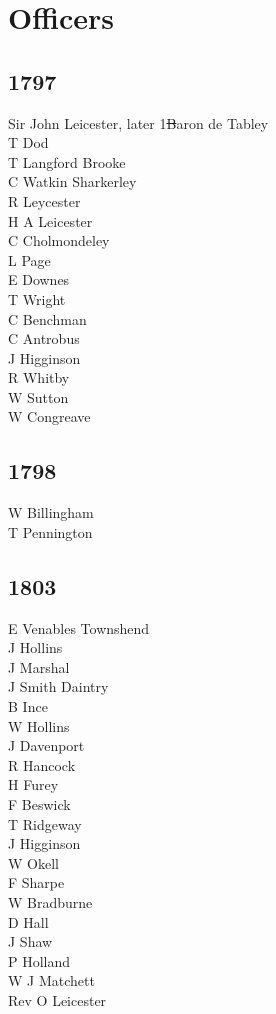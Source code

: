 \chapter*{Officers}

\begin{multicols}{2}
  \noindent
  \section*{1797}
  Sir John Leicester, later 1\st Baron de Tabley \\
  T Dod \\
  T Langford Brooke \\
  C Watkin Sharkerley \\
  R Leycester \\
  H A Leicester \\
  C Cholmondeley \\
  L Page \\
  E Downes \\
  T Wright \\
  C Benchman \\
  C Antrobus \\
  J Higginson \\
  R Whitby \\
  W Sutton \\
  W Congreave \\
  \section*{1798}
  W Billingham \\
  T Pennington \\
  \section*{1803}
  E Venables Townshend \\
  J Hollins \\
  J Marshal \\
  J Smith Daintry \\
  B Ince \\
  W Hollins \\
  J Davenport \\
  R Hancock \\
  H Furey \\
  F Beswick \\
  T Ridgeway \\
  J Higginson \\
  W Okell \\
  F Sharpe \\
  W Bradburne \\
  D Hall \\
  J Shaw \\
  P Holland \\
  W J Matchett \\
  Rev O Leicester \\

\end{multicols}
